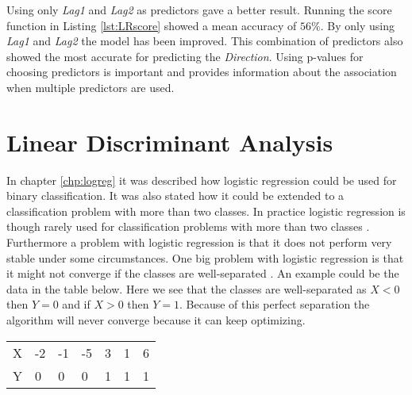 Using only \emph{Lag1} and \emph{Lag2} as predictors gave a better result. Running the score function in Listing \ref{lst:LRscore} showed a mean accuracy of $56\%$. By only using \emph{Lag1} and \emph{Lag2} the model has been improved. This combination of predictors also showed the most accurate for predicting the \emph{Direction}. Using p-values for choosing predictors is important and provides information about the association when multiple predictors  are used.

\section{Linear Discriminant Analysis}
\label{chp:lindisana}

In chapter \ref{chp:logreg} it was described how logistic regression could be used for binary classification. It was also stated how it could be extended to  a classification problem with more than two classes. In practice logistic regression is though rarely used for classification problems with more than two classes \citep[pp. 137]{ISLR}. Furthermore a problem with logistic regression is that it does not perform very stable under some circumstances. One big problem with logistic regression is that it might not converge if the classes are well-separated  \citep{convergencefailure}. An example could be the data in the table below. Here we see that the classes are well-separated as $X<0$ then $Y=0$ and if $X>0$ then $Y=1$. Because of this perfect separation the algorithm will never converge because it can keep optimizing.

\begin{center} 
	\begin{tabular}{l|llllll}
		X & -2 & -1 & -5 & 3 & 1 & 6 \\[0.05cm] 
		Y &  0 &  0 &  0 & 1 & 1 & 1  \\[0.05cm] 
	\end{tabular}
\end{center}

